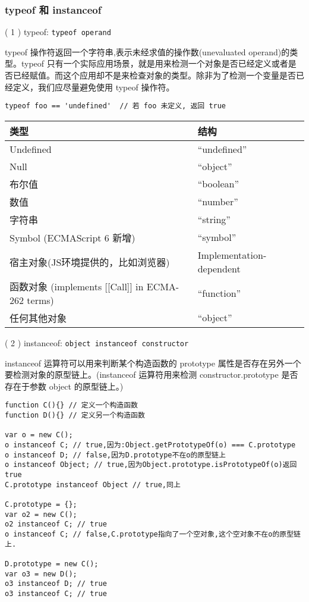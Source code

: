 \subsubsection{typeof 和 instanceof}\hypertarget{typeof--instanceof}{}\label{typeof--instanceof}

( 1 ) typeof: \texttt{typeof operand}

typeof 操作符返回一个字符串,表示未经求值的操作数(unevaluated operand)的类型。typeof 只有一个实际应用场景，就是用来检测一个对象是否已经定义或者是否已经赋值。而这个应用却不是来检查对象的类型。除非为了检测一个变量是否已经定义，我们应尽量避免使用 typeof 操作符。

\begin{verbatim}typeof foo == 'undefined'  // 若 foo 未定义, 返回 true
\end{verbatim}

\begin{longtable}{|l|l|}   %
\hline
类型 & 结构\\
\hline
Undefined & ``undefined''\\
Null & ``object''\\
布尔值 & ``boolean''\\
数值 & ``number''\\
字符串 & ``string''\\
Symbol (ECMAScript 6 新增) & ``symbol''\\
宿主对象(JS环境提供的，比如浏览器) & Implementation-dependent\\
函数对象 (implements [[Call]] in ECMA-262 terms) & ``function''\\
任何其他对象 & ``object''\\
\hline
\end{longtable}   %

( 2 ) instanceof: \texttt{object instanceof constructor}

instanceof 运算符可以用来判断某个构造函数的 prototype 属性是否存在另外一个要检测对象的原型链上。(instanceof 运算符用来检测 constructor.prototype 是否存在于参数 object 的原型链上。)

\begin{verbatim}function C(){} // 定义一个构造函数
function D(){} // 定义另一个构造函数

var o = new C();
o instanceof C; // true,因为:Object.getPrototypeOf(o) === C.prototype
o instanceof D; // false,因为D.prototype不在o的原型链上
o instanceof Object; // true,因为Object.prototype.isPrototypeOf(o)返回true
C.prototype instanceof Object // true,同上

C.prototype = {};
var o2 = new C();
o2 instanceof C; // true
o instanceof C; // false,C.prototype指向了一个空对象,这个空对象不在o的原型链上.

D.prototype = new C();
var o3 = new D();
o3 instanceof D; // true
o3 instanceof C; // true
\end{verbatim}

